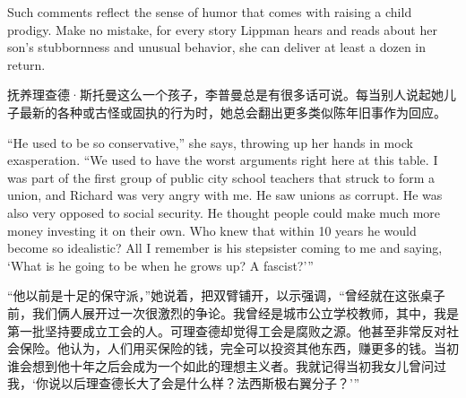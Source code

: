 \ifdefined\eng
Such comments reflect the sense of humor that comes with raising a child prodigy. Make no mistake, for every story Lippman hears and reads about her son's stubbornness and unusual behavior, she can deliver at least a dozen in return.
\fi

\ifdefined\chs
抚养理查德·斯托曼这么一个孩子，李普曼总是有很多话可说。每当别人说起她儿子最新的各种或古怪或固执的行为时，她总会翻出更多类似陈年旧事作为回应。
\fi

\ifdefined\eng
``He used to be so conservative,'' she says, throwing up her hands in mock exasperation. ``We used to have the worst arguments right here at this table. I was part of the first group of public city school teachers that struck to form a union, and Richard was very angry with me. He saw unions as corrupt. He was also very opposed to social security. He thought people could make much more money investing it on their own. Who knew that within 10 years he would become so idealistic? All I remember is his stepsister coming to me and saying, `What is he going to be when he grows up? A fascist?'\hspace{0.01in}''\ifdefined\vtwo{}\fi
\fi

\ifdefined\chs
``他以前是十足的保守派，''她说着，把双臂铺开，以示强调，``曾经就在这张桌子前，我们俩人展开过一次很激烈的争论。我曾经是城市公立学校教师，其中，我是第一批坚持要成立工会的人。可理查德却觉得工会是腐败之源。他甚至非常反对社会保险。他认为，人们用买保险的钱，完全可以投资其他东西，赚更多的钱。当初谁会想到他十年之后会成为一个如此的理想主义者。我就记得当初我女儿曾问过我，`你说以后理查德长大了会是什么样？法西斯极右翼分子？'\hspace{0.01in}''
\fi

